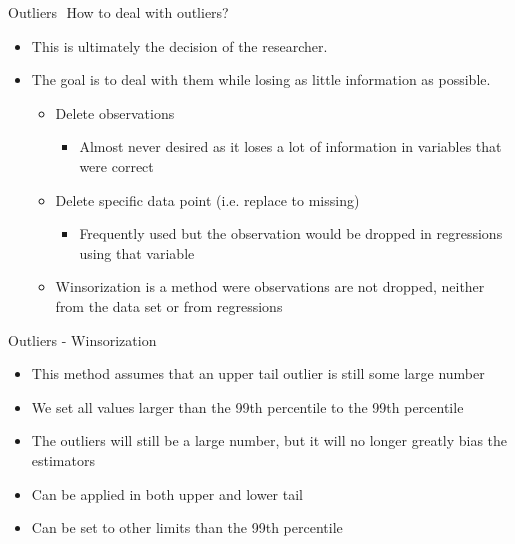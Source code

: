 \documentclass[aspectratio=169]{beamer}
\begin{document}
\begin{frame}{Outliers \newline How to deal with outliers?}
	\begin{itemize}
		\item This is ultimately the decision of the researcher.
		\item The goal is to deal with them while losing as little information as possible.
			\begin{itemize}
				\item Delete observations 
					\begin{itemize}
						\item Almost never desired as it loses a lot of information in variables that were correct
					\end{itemize}
				\item Delete specific data point (i.e. replace to missing)
					\begin{itemize}
						\item Frequently used but the observation would be dropped in regressions using that variable
					\end{itemize}
				\item Winsorization is a method were observations are not dropped, neither from the data set or from regressions			
			\end{itemize}		
	\end{itemize}
\end{frame}

\begin{frame}{Outliers - Winsorization}
\begin{itemize}
	\item This method assumes that an upper tail outlier is still some large number
	\item We set all values larger than the 99th percentile to the 99th percentile
	\item The outliers will still be a large number, but it will no longer greatly bias the estimators
	\item Can be applied in both upper and lower tail
	\item Can be set to other limits than the 99th percentile
\end{itemize}
\end{frame}
\end{document}
